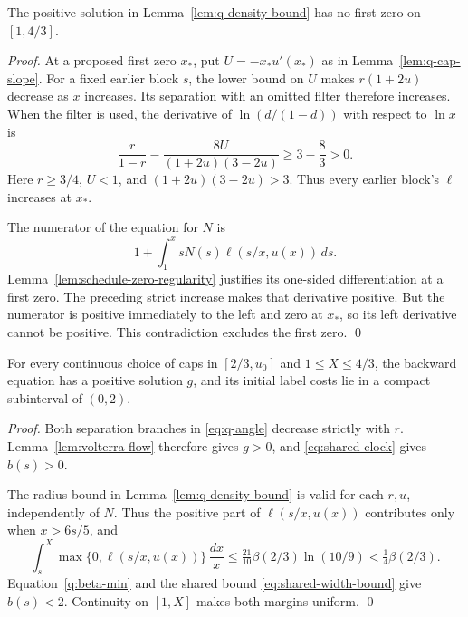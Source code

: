 \documentclass[runningheads,envcountsame,envcountsect,orivec]{llncs}
\begin{document}
\begin{lemma}
\label{lem:q-no-zero}
The positive solution in Lemma~\ref{lem:q-density-bound}
has no first zero on $[1,4/3]$.
\end{lemma}

\begin{proof}
At a proposed first zero $x_*$, put $U=-x_*u'(x_*)$
as in Lemma~\ref{lem:q-cap-slope}.
For a fixed earlier block $s$, the lower bound on $U$
makes $r(1+2u)$ decrease as $x$ increases. Its separation with an omitted
filter therefore increases. When the filter is used,
the derivative of $\ln(d/(1-d))$ with respect to $\ln x$
is
\[
 \frac{r}{1-r}-\frac{8U}{(1+2u)(3-2u)}
 \ge3-\frac83>0.
\]
Here $r\ge3/4$, $U<1$, and $(1+2u)(3-2u)>3$.
Thus every earlier block's $\ell$ increases at $x_*$.

The numerator of the equation for $N$ is
\[
 1+\int_1^x sN(s)\ell(s/x,u(x))\,ds.
\]
Lemma~\ref{lem:schedule-zero-regularity} justifies its one-sided
differentiation at a first zero. The preceding strict
increase makes that derivative positive. But the numerator
is positive immediately to the left and zero at $x_*$,
so its left derivative cannot be positive. This contradiction
excludes the first zero.
\qed
\end{proof}

\begin{lemma}
\label{lem:q-widths}
For every continuous choice of caps in $[2/3,u_0]$ and
$1\le X\le4/3$, the backward equation has a positive solution
$g$, and its initial label costs lie in a compact
subinterval of $(0,2)$.
\end{lemma}

\begin{proof}
Both separation branches in \eqref{eq:q-angle} decrease
strictly with $r$. Lemma~\ref{lem:volterra-flow} therefore
gives $g>0$, and \eqref{eq:shared-clock} gives $b(s)>0$.

The radius bound in Lemma~\ref{lem:q-density-bound} is
valid for each $r,u$, independently of $N$. Thus the
positive part of $\ell(s/x,u(x))$ contributes only when
$x>6s/5$, and
\[
 \int_s^X\max\{0,\ell(s/x,u(x))\}\,\frac{dx}{x}
 \le\tfrac{21}{10}\beta(2/3)\ln(10/9)
 <\tfrac14\beta(2/3).
\]
Equation~\eqref{q:beta-min} and the shared bound
\eqref{eq:shared-width-bound} give $b(s)<2$.
Continuity on $[1,X]$ makes both margins uniform.
\qed
\end{proof}
\end{document}
